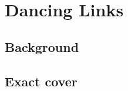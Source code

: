 
\chapter{Dancing Links}
\label{dancing_links}



\section{Background}


\section{Exact cover}







